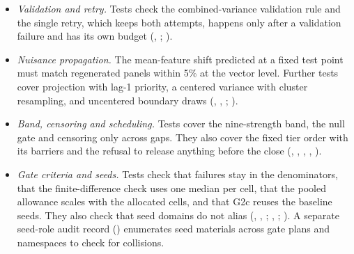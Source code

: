 \begin{itemize}
\item \emph{Validation and retry.} Tests check the combined-variance validation rule and the single retry, which keeps both attempts, happens only after a validation failure and has its own budget (, ; ).
\item \emph{Nuisance propagation.} The mean-feature shift predicted at a fixed test point must match regenerated panels within 5\% at the vector level. Further tests cover projection with lag-1 priority, a centered variance with cluster resampling, and uncentered boundary draws (, , ; ).
\item \emph{Band, censoring and scheduling.} Tests cover the nine-strength band, the null gate and censoring only across gaps. They also cover the fixed tier order with its barriers and the refusal to release anything before the close (, , , , ).
\item \emph{Gate criteria and seeds.} Tests check that failures stay in the denominators, that the finite-difference check uses one median per cell, that the pooled allowance scales with the allocated cells, and that G2c reuses the baseline seeds. They also check that seed domains do not alias (, , ; , ; ). A separate seed-role audit record () enumerates seed materials across gate plans and namespaces to check for collisions.
\end{itemize}

